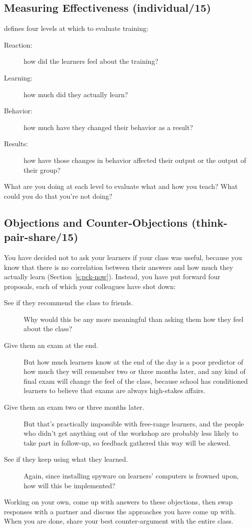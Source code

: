 \subsection*{Measuring Effectiveness (individual/15)}

\cite{Kirk1994} defines four levels at which to evaluate training:

\begin{description}
\item[Reaction:]
how did the learners feel about the training?
\item[Learning:]
how much did they actually learn?
\item[Behavior:]
how much have they changed their behavior as a result?
\item[Results:]
how have those changes in behavior affected their output or the
output of their group?
\end{description}

What are you doing at each level to evaluate what and how you teach?
What could you do that you're not doing?

\subsection*{Objections and Counter-Objections (think-pair-share/15)}

You have decided not to ask your learners if your class was useful,
because you know that there is no correlation between their answers and
how much they actually learn (Section~\ref{s:pck-now}). Instead, you have
put forward four proposals, each of which your colleagues have shot
down:

\begin{description}
\item[See if they recommend the class to friends.]
Why would this be any more meaningful than asking them how they feel
about the class?
\item[Give them an exam at the end.]
But how much learners know at the end of the day is a poor predictor
of how much they will remember two or three months later, and any
kind of final exam will change the feel of the class, because school
has conditioned learners to believe that exams are always
high-stakes affairs.
\item[Give them an exam two or three months later.]
But that's practically impossible with free-range learners, and the
people who didn't get anything out of the workshop are probably less
likely to take part in follow-up, so feedback gathered this way will
be skewed.
\item[See if they keep using what they learned.]
Again, since installing spyware on learners' computers is frowned
upon, how will this be implemented?
\end{description}

Working on your own, come up with answers to these objections, then swap
responses with a partner and discuss the approaches you have come up
with. When you are done, share your best counter-argument with the
entire class.
